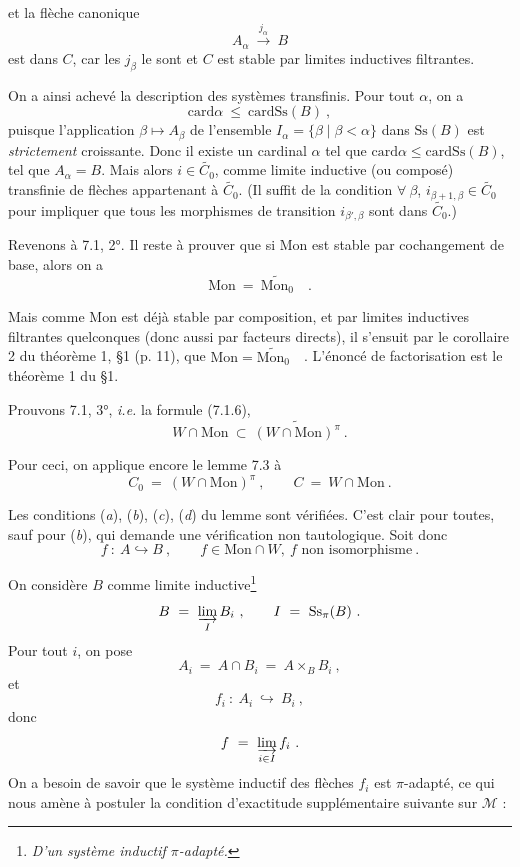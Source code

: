 \documentclass[11pt]{article}
\newcommand{\printedpage}[1]{\marginpar{\footnotesize p.~#1}}
\newcommand{\msp}[1]{\marginpar{\footnotesize [#1]}}
\newcommand{\Mon}{\mathrm{Mon}}
\newcommand{\Ss}{\mathrm{Ss}}
\newcommand{\card}{\mathrm{card}}
\begin{document}
\msp{page 93}

et la flèche canonique
\[
A_\alpha \ \xrightarrow{j_\alpha} \ B
\]
est dans $C$, car les $j_\beta$ le sont et $C$ est stable par limites inductives filtrantes.

On a ainsi achevé la description des systèmes transfinis. Pour tout $\alpha$, on a
\[
\card \alpha \ \leq \ \card \Ss(B) \ ,
\]
puisque l'application $\beta \longmapsto A_\beta$ de l'ensemble $I_\alpha = \{\beta \mid \beta < \alpha\}$ dans $\Ss(B)$ est \textit{strictement} croissante. Donc il existe un cardinal $\alpha$ tel que $\card \alpha \leq \card \Ss(B)$, tel que $A_\alpha = B$. Mais alors $i \in \widetilde{C_0}$, comme limite inductive (ou composé) transfinie de flèches appartenant à $\widetilde{C_0}$. (Il suffit de la condition $\forall\ \beta$, $i_{\beta+1,\beta} \in \widetilde{C_0}$ pour impliquer que tous les morphismes de transition $i_{\beta',\beta}$ sont dans $\widetilde{C_0}$.)

Revenons à 7.1, 2°. Il reste à prouver que si Mon est stable par cochangement de base, alors on a
\[
\Mon \ = \ \widetilde{\Mon_0} \quad .
\]

Mais comme Mon est déjà stable par composition, et par limites inductives filtrantes quelconques (donc aussi par facteurs directs), il s'ensuit par le corollaire 2 du théorème 1, §1 (p. 11), que $\Mon = \widetilde{\Mon_0}$\ \ . L'énoncé de factorisation est le théorème 1 du §1.

\printedpage{52}

\msp{page 94}

Prouvons 7.1, 3°, \textit{i.e.} la formule (7.1.6),
\[
W \cap \Mon \ \subset \ \widetilde{(W \cap \Mon)^{\pi}} \ .
\]

Pour ceci, on applique encore le lemme 7.3 à
\[
C_0 \ = \ (W \cap \Mon)^{\pi} \ , \qquad C \ = \ W \cap \Mon \ .
\]

Les conditions (\textit{a}), (\textit{b}), (\textit{c}), (\textit{d}) du lemme sont vérifiées. C'est clair pour toutes, sauf pour (\textit{b}), qui demande une vérification non tautologique. Soit donc
\[
f \ : \ A \hookrightarrow B \ , \qquad f \in \Mon \cap W,\ f \text{ non isomorphisme} \ .
\]

On considère $B$ comme limite inductive\footnote[33]{\textit{D'un système inductif $\pi$-adapté.}}
\[
B \ = \ \varinjlim_{I} B_i \ , \qquad I \ = \ \Ss_{\pi}(B) \ .
\]
Pour tout $i$, on pose
\[
A_i \ = \ A \cap B_i \ = \ A \times_B B_i \ ,
\]
et
\[
f_i \ : \ A_i \ \hookrightarrow \ B_i \ ,
\]
donc
\[
f \ = \ \varinjlim_{i \in I} f_i \ .
\]
On a besoin de savoir que le système inductif des flèches $f_i$ est $\pi$-adapté, ce qui nous amène à postuler la condition d'exactitude supplémentaire suivante sur $\mathcal{M}$ :
\end{document}
